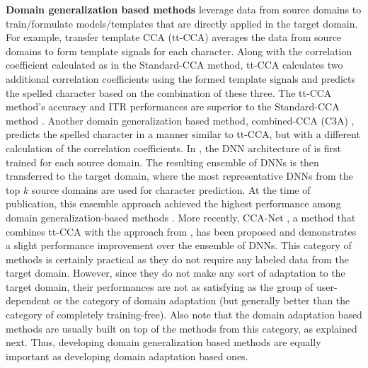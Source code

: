 \documentclass[12pt]{iopart}
\begin{document}
{\bf Domain generalization based methods} leverage data from source domains to train/formulate models/templates that are directly applied in the target domain. For example, transfer template CCA (tt-CCA) \cite{tt-CCA} averages the data from source domains to form template signals for each character. Along with the correlation coefficient calculated as in the Standard-CCA method, tt-CCA calculates two additional correlation coefficients using the formed template signals and predicts the spelled character based on the combination of these three. The tt-CCA method's accuracy and ITR performances are superior to the Standard-CCA method \cite{tt-CCA}. Another domain generalization based method, combined-CCA (C3A) \cite{comb-tCCA}, predicts the spelled character in a manner similar to tt-CCA, but with a different calculation of the correlation coefficients. In \cite{our_ensemble}, the DNN architecture of \cite{ournetwork} is first trained for each source domain. The resulting ensemble of DNNs is then transferred to the target domain, where the most representative DNNs from the top $k$ source domains are used for character prediction. {At the time of publication, this ensemble approach achieved the highest performance among domain generalization-based methods \cite{our_ensemble}.  More recently, CCA-Net \cite{cca_net}, a method that combines tt-CCA \cite{tt-CCA} with the approach from \cite{osssvep}, has been proposed and demonstrates a slight performance improvement over the ensemble of DNNs.} This category of methods is certainly practical as they do not require any labeled data from the target domain. However, since they do not make any sort of adaptation to the target domain, their performances are not as satisfying as the group of user-dependent or the category of domain adaptation (but generally better than the category of completely training-free). Also note that the domain adaptation based methods are usually built on top of the methods from this category, as explained next. Thus, developing domain generalization based methods are equally important as developing domain adaptation based ones.
\end{document}
